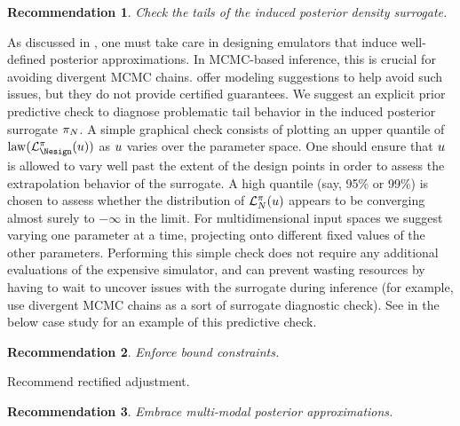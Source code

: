 \documentclass[12pt]{article}
\newtheorem{rec}{Recommendation}
\begin{document}
\begin{rec} \label{rec:pred-check-tails}
Check the tails of the induced posterior density surrogate.
\end{rec}
As discussed in , one must take care in designing emulators that
induce well-defined posterior approximations. In MCMC-based inference, this is crucial for
avoiding divergent MCMC chains. 
offer modeling suggestions to help avoid such issues, but they do not provide certified 
guarantees. We suggest an explicit prior predictive check to diagnose problematic 
tail behavior in the induced posterior surrogate $\postEm[\Ndesign]$. A simple graphical
check consists of plotting an upper quantile of $\mathrm{law}(\lpostEm[\Nesign](\Par))$ 
as $\Par$ varies over the parameter space. One should ensure that $\Par$ is allowed to 
vary well past the extent of the design points in order to assess the extrapolation behavior 
of the surrogate. A high quantile (say, 95\% or 99\%) is chosen to assess whether 
the distribution of $\lpostEm[\Ndesign](\Par)$ appears to be converging almost surely 
to $-\infty$ in the limit. For multidimensional input spaces we suggest varying one 
parameter at a time, projecting onto different fixed values of the other parameters.
Performing this simple check does not require any additional 
evaluations of the expensive simulator, and can prevent wasting resources by having
to wait to uncover issues with the surrogate during inference (for example, 
\citet{emPostDens} use divergent MCMC chains as a sort of surrogate diagnostic check).
 See  in the below case study for an example
 of this predictive check.

\begin{rec} \label{rec:bound-constraints}
Enforce bound constraints.
\end{rec}

Recommend rectified adjustment.

\begin{rec} \label{rec:multimodal-post-approx}
Embrace multi-modal posterior approximations.
\end{rec}
\end{document}
